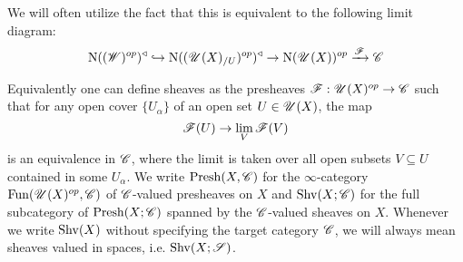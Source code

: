 \documentclass[../../thesis.tex]{subfiles}
\begin{document}
\begin{remark}
    We will often utilize the fact that this is equivalent to the following limit diagram:
    \[
        \mathrm{N}((\mathscr{W})^{op})^{\triangleleft} \hookrightarrow \mathrm{N}((\mathscr{U}(X)_{/U})^{op})^{\triangleleft} \rightarrow \mathrm{N}(\mathscr{U}(X))^{op}\xrightarrow{\mathscr{F}}\mathscr{C}
    \]
\end{remark}
Equivalently one can define sheaves as the presheaves $\mathscr{F} : \mathscr{U}(X)^{op} \to \mathscr{C}$ such that for any open cover $\{U_{\alpha}\}$ of an open set $U \in \mathscr{U}(X)$, the map
\[
    \mathscr{F}(U) \to \lim_V \mathscr{F}(V)
\]
is an equivalence in $\mathscr{C}$, where the limit is taken over all open subsets $V\subseteq U$ contained in some $U_{\alpha}$.
We write $\mathrm{Presh}(X, \mathscr{C})$ for the $\infty$-category $\mathrm{Fun}(\mathscr{U}(X)^{op}, \mathscr{C})$ of $\mathscr{C}$-valued presheaves on $X$ and $\mathrm{Shv}(X;\mathscr{C})$ for the full subcategory of $\mathrm{Presh}(X;\mathscr{C})$ spanned by the $\mathscr{C}$-valued sheaves on $X$.
Whenever we write $\mathrm{Shv}(X)$ without specifying the target category $\mathscr{C}$, we will always mean sheaves valued in spaces, i.e. $\mathrm{Shv}(X;\mathscr{S})$.
\end{document}
